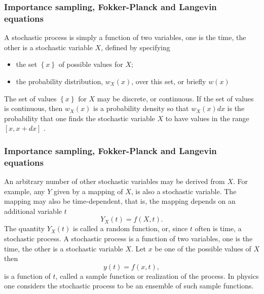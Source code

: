 \documentclass{beamer}
\begin{document}
\begin{frame}
\frametitle{Importance sampling, Fokker-Planck and Langevin equations}

\begin{block}{}
A stochastic process is simply a function of two variables, one is the time,
the other is a stochastic variable $X$, defined by specifying
\begin{itemize}
\item the set $\left\{x\right\}$ of possible values for $X$;

\item the probability distribution, $w_X(x)$,  over this set, or briefly $w(x)$
\end{itemize}

\noindent
The set of values $\left\{x\right\}$ for $X$ 
may be discrete, or continuous. If the set of
values is continuous, then $w_X (x)$ is a probability density so that 
$w_X (x)dx$
is the probability that one finds the stochastic variable $X$ to have values
in the range $[x, x + dx]$ .
\end{block}
\end{frame}

\begin{frame}
\frametitle{Importance sampling, Fokker-Planck and Langevin equations}

\begin{block}{}
     An arbitrary number of other stochastic variables may be derived from
$X$. For example, any $Y$ given by a mapping of $X$, is also a stochastic
variable. The mapping may also be time-dependent, that is, the mapping
depends on an additional variable $t$
\[
                              Y_X (t) = f (X, t) .
\]
The quantity $Y_X (t)$ is called a random function, or, since $t$ often is time,
a stochastic process. A stochastic process is a function of two variables,
one is the time, the other is a stochastic variable $X$. Let $x$ be one of the
possible values of $X$ then
\[
                               y(t) = f (x, t),
\]
is a function of $t$, called a sample function or realization of the process.
In physics one considers the stochastic process to be an ensemble of such
sample functions.
\end{block}
\end{frame}
\end{document}
